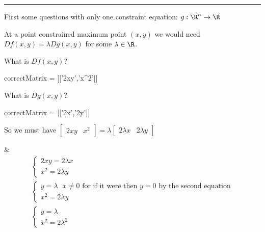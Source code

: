 \documentclass{ximera}
\begin{document}
	\hrule

	First some questions with only one constraint equation:  $g:\R^n \to \R$
	
	\begin{question}
		\begin{solution}
		\begin{hint}
			At a point constrained maximum point $(x,y)$ we would need $Df(x,y) = \lambda Dg(x,y)$ for some $\lambda \in \R$.
		\end{hint}
		\begin{hint}
			\begin{question}
			\begin{solution}
				What is $Df(x,y)$?
					\begin{matrix-answer}
						correctMatrix = [['2xy','x^2']]
					\end{matrix-answer}
			\end{solution}
			\begin{solution}
				What is $Dg(x,y)$?
					\begin{matrix-answer}
						correctMatrix = [['2x','2y']]
					\end{matrix-answer}
			\end{solution}
			\end{question}
		\end{hint}
		\begin{hint}
			So we must have \(\begin{bmatrix} 2xy & x^2\end{bmatrix} = \lambda \begin{bmatrix} 2\lambda x & 2\lambda y\end{bmatrix}\)
		\end{hint}
		\begin{hint}
			&\begin{align*}
				\begin{cases}
				2xy = 2\lambda x\\
				x^2 =  2\lambda y
				\end{cases}\\
				\begin{cases}
				y = \lambda \text{  $x \neq 0$ for if it were then $y=0$ by the second equation}\\
				x^2 =  2\lambda y
				\end{cases}\\
				\begin{cases}
				y = \lambda\\
				x^2 =  2\lambda^2
				\end{cases}

\end{align*}
\end{hint}
\end{solution}
\end{question}
\end{document}
